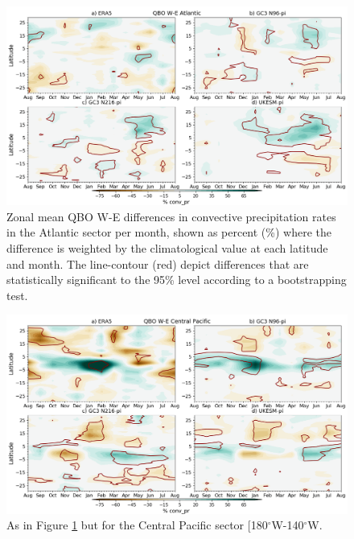 \begin{figure}[t!]
\centering
 \includegraphics[width=\linewidth]{figures/anomcmip_conv_pratlqbow.png}
\caption[Atlantic ITCZ convective precipitation differences on QBO phase.]{ Zonal mean QBO W-E differences in convective precipitation rates in the Atlantic sector per month, shown as percent (\%) where the difference is weighted by the climatological value at each latitude  and month. The line-contour (red) depict differences that are statistically significant to the 95\% level according to a bootstrapping test. }
\label{fig:itczqbowatl}
\end{figure}


\begin{figure}[t!]
\centering
 \includegraphics[width=\linewidth]{figures/anomcmip_conv_prcpqbow.png}
\caption[Central Pacific ITCZ convective precipitation differences on QBO phase.]{As in Figure \ref{fig:itczqbowatl} but for the Central Pacific sector [180$^\circ$W-140$^\circ$W.}
\label{fig:itczqbowcp}
\end{figure}

